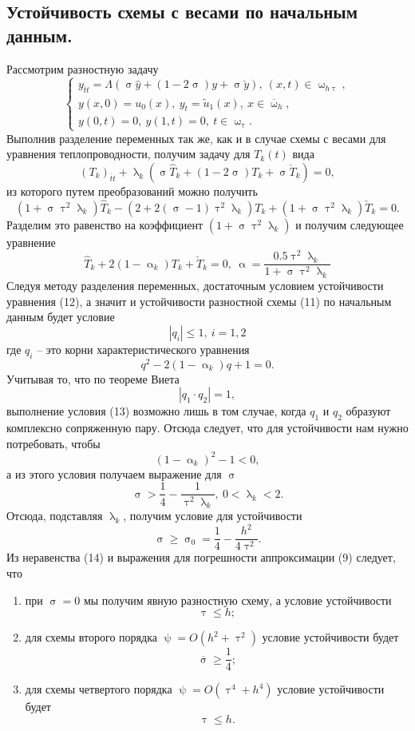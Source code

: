 \documentclass[a4paper, 12pt]{report}
\numberwithin{equation}{section}
\newcommand{\ol}{\overline}
\renewcommand{\leq}{\leqslant}
\renewcommand{\geq}{\geqslant}
\renewcommand{\alpha}{\upalpha}
\renewcommand{\tau}{\uptau}
\renewcommand{\lambda}{\uplambda}
\renewcommand{\sigma}{\upsigma}
\renewcommand{\psi}{\uppsi}
\renewcommand{\omega}{\upomega}
\begin{document}
	\subsection{Устойчивость схемы с весами по начальным данным.}
	Рассмотрим разностную задачу
	\begin{equation}
		\begin{cases}
			y_{\ol t t} = \Lambda (\sigma \hat y + (1-2\sigma) y + \sigma \check y),\ (x,t) \in \omega_{h\tau},\\
			y(x,0) = u_0(x),\ y_t = \tilde u_1(x),\ x \in \ol\omega_h,\\
			y(0,t) = 0,\ y(1,t) = 0,\ t \in \omega_\tau.
		\end{cases}
	\end{equation}
	Выполнив разделение переменных так же, как и в случае схемы с весами для уравнения теплопроводности, получим задачу для $T_k(t)$ вида
	\begin{equation*}
		(T_k)_{\ol t t} + \lambda_k ( \sigma \hat T_k + (1-2\sigma) T_k + \sigma \check T_k) = 0,
	\end{equation*}
	из которого путем преобразований можно получить
	$$(1+\sigma \tau^2\lambda_k)\hat T_k - (2 + 2(\sigma - 1)\tau^2 \lambda_k)T_k + (1+\sigma \tau^2 \lambda_k)\check T_k = 0.$$
	Разделим это равенство на коэффициент $(1+\sigma \tau^2\lambda_k)$ и получим следующее уравнение
	\begin{equation}
		\hat T_k + 2(1-\alpha_k)T_k + \check{T}_k = 0,\ \alpha = \dfrac{0.5 \tau^2 \lambda_k}{1+\sigma \tau^2 \lambda_k}
	\end{equation}
	Следуя методу разделения переменных, достаточным условием устойчивости уравнения (12), а значит и устойчивости разностной схемы (11) по начальным данным будет условие
	\begin{equation}
		|q_i| \leq 1,\ i=1,2
	\end{equation}
	где $q_i$ -- это корни характеристического уравнения
	$$q^2 -2(1-\alpha_k)q + 1 = 0.$$
	Учитывая то, что по теореме Виета $$|q_1\cdot q_2| =1,$$ 
	выполнение условия (13) возможно лишь в том случае, когда $q_1$ и $q_2$ образуют комплексно сопряженную пару. Отсюда следует, что для устойчивости нам нужно потребовать, чтобы $$(1-\alpha_k)^2 - 1 < 0,$$
	а из этого условия получаем выражение для $\sigma$
	$$\sigma > \dfrac 14 - \dfrac{1}{\tau^2 \lambda_k},\ 0<\lambda_k < 2.$$
	Отсюда, подставляя $\lambda_k$, получим условие для устойчивости
	\begin{equation}
		\sigma \geq \sigma_0 = \dfrac 14 - \dfrac{h^2}{4\tau^2}.
	\end{equation}
	Из неравенства (14) и выражения для погрешности аппроксимации (9) следует, что 
	\begin{enumerate}
		\item при $\sigma = 0$ мы получим явную разностную схему, а условие устойчивости $$\tau \leq h;$$
		\item для схемы второго порядка $\psi = O(h^2 + \tau^2)$ условие устойчивости будет
		$$\ol \sigma \geq \dfrac 14;$$
		\item для схемы четвертого порядка $\psi = O(\tau^4 + h^4)$ условие устойчивости будет
		$$\tau \leq h.$$
	\end{enumerate}
\end{document}
